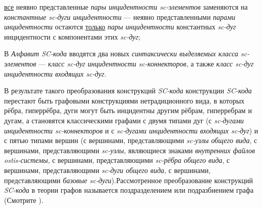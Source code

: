 \begin{SCn}
\begin{scnstruct}
\begin{scnsubstruct}
{                \begin{scnitemize}
                    \item \uline{все} неявно представленные \textit{пары инцидентности sc-элементов} заменяются на \textit{константные sc-дуги инцидентности} --- неявно представленными \textit{парами инцидентности} остаются \uline{только} \textit{пары инцидентности} константных \textit{sc-дуг} инцидентности с компонентами этих \textit{sc-дуг};
                    \item В \textit{Алфавит SC-кода} вводятся два новых \textit{синтаксически выделяемых класса sc-элементов} --- \textit{класс sc-дуг инцидентности sc-коннекторов}, а также \textit{класс sc-дуг инцидентности входящих sc-дуг}.
                \end{scnitemize}
                В результате такого преобразования конструкций \textit{SC-кода} конструкции \textit{SC-кода} перестают быть графовыми конструкциями нетрадиционного вида, в которых рёбра, гиперрёбра, дуги могут быть инцидентны другим рёбрам, гиперребрам и дугам, а становятся классическими графами с двумя типами дуг (с \textit{sc-дугами инцидентности sc-коннекторов} и с \textit{sc-дугами инцидентности входящих sc-дуг}) и с пятью типами вершин (с вершинами, представляющими \textit{sc-узлы общего вида}, с вершинами, представляющими \textit{sc-узлы}, являющиеся знаками \textit{внутренних файлов ostis-системы}, с вершинами, представляющими \textit{sc-рёбра общего вида}, с вершинами, представляющими \textit{sc-дуги общего вида}, с вершинами, представляющими \textit{базовые sc-дуги}).Рассмотренное преобразование конструкций \textit{SC-кода} в теории графов называется поздразделением или подразбиением графа (Смотрите \cite{Trudeau1993}).}
            \end{scnsubstruct}
            \scnendsegmentcomment
            \bigskip
        \end{scnstruct}
    \scnendcurrentsectioncomment
    
    \end{SCn}
    \label{sd_sc_code_syntax}
    \label{sd_sc_code_semantic}